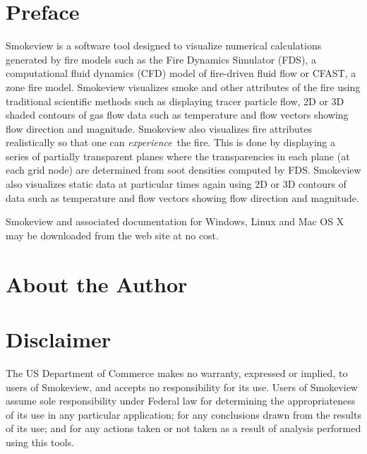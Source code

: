 \documentclass[11pt,twoside]{book}
\begin{document}
\chapter{Preface}
Smokeview is a software tool designed to visualize numerical
calculations generated by fire models such as the Fire Dynamics
Simulator (FDS), a computational fluid dynamics (CFD) model of
fire-driven fluid flow or CFAST, a zone fire model. Smokeview
visualizes smoke and other attributes of the fire using
traditional scientific methods such as displaying tracer particle
flow, 2D or 3D shaded contours of gas flow data such as
temperature and flow vectors showing flow direction and magnitude.
Smokeview also visualizes fire attributes realistically so that
one can {\em experience}\ the fire. This is done by displaying a
series of partially transparent planes where the transparencies in
each plane (at each grid node) are determined from soot densities
computed by FDS.  Smokeview also visualizes static data at
particular times again using 2D or 3D contours of data such as
temperature and flow vectors showing flow direction and magnitude.

Smokeview and associated documentation for Windows, Linux and Mac
OS X may be downloaded from the web site {\bf
{}} at no cost.


\chapter{About the Author}

\begin{description}
\gforneybio
\end{description}


\chapter{Disclaimer}

The US Department of Commerce makes no warranty,
expressed or implied, to users of Smokeview, and accepts no
responsibility for its use. Users of Smokeview assume sole
responsibility under Federal law for determining the
appropriateness of its use in any particular application; for any
conclusions drawn from the results of its use; and for any actions
taken or not taken as a result of analysis performed using this
tools.
\end{document}
